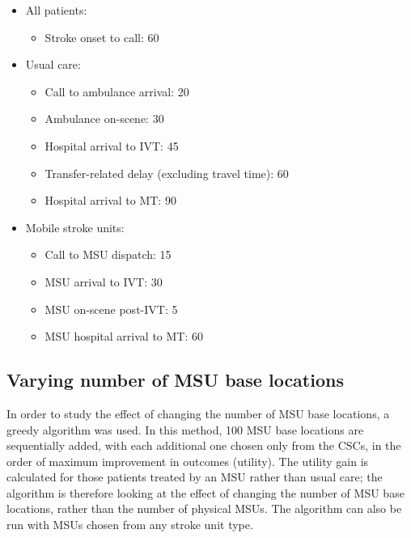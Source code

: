 \begin{minipage}{1.0\textwidth}  %
\begin{spacing}{1.2}
\begin{itemize}
    \item All patients:
    \begin{itemize}
        \item Stroke onset to call: 60
    \end{itemize}
    \item Usual care:
    \begin{itemize}
        \item Call to ambulance arrival: 20
        \item Ambulance on-scene: 30
        \item Hospital arrival to IVT: 45
        \item Transfer-related delay (excluding travel time): 60
        \item Hospital arrival to MT: 90
    \end{itemize}
    \item Mobile stroke units:
    \begin{itemize}
        \item Call to MSU dispatch: 15
        \item MSU arrival to IVT: 30
        \item MSU on-scene post-IVT: 5
        \item MSU hospital arrival to MT: 60
    \end{itemize}
\end{itemize}
\end{spacing}
\end{minipage}


\subsection{Varying number of MSU base locations}

In order to study the effect of changing the number of MSU base locations, a greedy algorithm was used. In this method, 100 MSU base locations are sequentially added, with each additional one chosen only from the CSCs, in the order of maximum improvement in outcomes (utility). The utility gain is calculated for those patients treated by an MSU rather than usual care; the algorithm is therefore looking at the effect of changing the number of MSU base locations, rather than the number of physical MSUs. The algorithm can also be run with MSUs chosen from any stroke unit type.